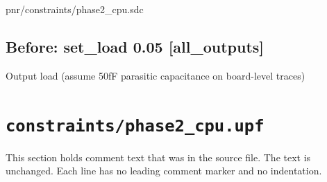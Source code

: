 \begin{relocated}{pnr/constraints/phase2_cpu.sdc}
\subsection*{Before: set\_load 0.05 [all\_outputs]}

\begin{textblock}
Output load (assume 50fF parasitic capacitance on board-level traces)
\end{textblock}

\end{relocated}

\section{\texttt{constraints/phase2\_cpu.upf}}\label{tm:pd:phase2-cpu-upf}

This section holds comment text that was in the source file. The text is unchanged. Each line has no leading comment marker and no indentation.


